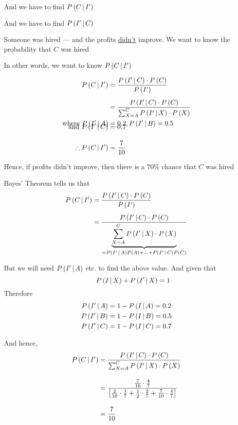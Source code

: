\documentclass[14pt,fleqn]{extarticle}
\newcommand\pa{\frac{1}{7}}
\newcommand\pb{\frac{2}{7}}
\newcommand\pc{\frac{4}{7}}
\begin{document}
\begin{question}
\begin{step}
\begin{options}
      And we have to find $P\left(C\,\vert\,I'\right)$ 
     \incorrect
     
     And we have to find $P\left(I'\,\vert\,C\right)$ 
        
    \end{options} 
     \reason 
       
     Someone was hired --- and the profits \underline{didn't} improve. We want to know 
     the probability that $C$ was hired \newline 
     
     In other words, we want to know $P\left(C\,\vert\,I'\right)$    
\end{step}

\begin{step}
  \begin{options} 
     \correct 
      
      \begin{align}
	P\left(C\,\vert\,I'\right) &= \frac{P\left(I'\,\vert\,C\right)\cdot P\left(C\right)}{P\left(I'\right)} \\[5pt]
	&= \dfrac{P\left(I'\,\vert\,C\right)\cdot P\left( C\right)}{\sum_{X = A}^C P\left(I'\,\vert\,X\right)\cdot P\left( X\right)} \\
	\text{where } P\left(I'\,\vert\,A\right) &= 0.2, P\left(I'\,\vert\,B\right) = 0.5 \\[-10pt]
	\text{and }P\left(I'\,\vert\,C\right) &= 0.7  \\[10pt]
	\therefore P\left(C\,\vert\,I'\right) &= \frac{7}{10} 
\end{align} 

Hence, if profits didn't improve, then there is a $70\%$ chance that $C$ was hired 
     
    \end{options} 
     \reason 
     
     Bayes' Theorem tells us that 
     \begin{align}
     P\left(C\,\vert\,I'\right) &= \frac{P\left(I'\,\vert\,C\right)\cdot P\left(C\right)}{P\left(I'\right)} \\[5pt]
     &= \dfrac{P\left(I'\,\vert\,C\right)\cdot P\left( C\right)}{\underbrace{\sum_{X=A}^CP\left(I'\,\vert\,X\right)\cdot P\left( X\right)}_{=P\left(I'\,\vert\,A\right)P\left( A\right) + \ldots + P\left(I'\,\vert\,C\right)P\left( C\right)}}
\end{align}

But we will need $P\left(I'\,\vert\,A\right)$ etc. to find the above value. And given that 
\[ \qquad P\left(I\,\vert\,X\right) + P\left(I'\,\vert\,X\right) = 1 \] 
Therefore
\begin{align}
P\left(I'\,\vert\,A\right) &= 1-P\left(I\,\vert\,A\right) = 0.2 \\
P\left(I'\,\vert\,B\right) &= 1-P\left(I\,\vert\,B\right) = 0.5 \\
P\left(I'\,\vert\,C\right) &= 1-P\left(I\,\vert\,C\right) = 0.7 
\end{align}

And hence, 
\begin{align}
\condp{C}{I'} &= \dfrac{\condp{I'}{C}\cdot\prob{C}}{\sum_{X=A}^C\condp{I'}{X}\cdot\prob{X}} \\[10pt]
&= \dfrac{\frac{7}{10}\cdot\pc}{\left[\frac{2}{10}\cdot\pa + \frac{1}{2}\cdot\pb + \frac{7}{10}\cdot\pc \right]} \\[10pt]
&= \frac{7}{10} 
\end{align}
       
\end{step}
\end{question} 
\end{document}
